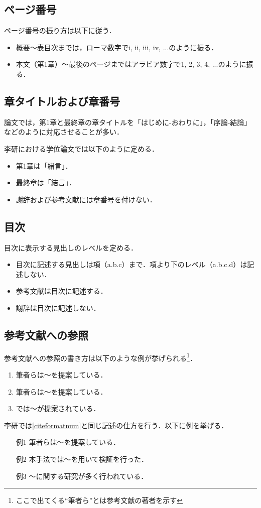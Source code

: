 \documentclass[12pt]{sonota/aislab}
\begin{document}
\subsection{ページ番号}
ページ番号の振り方は以下に従う．
\begin{itemize}
\item 概要～表目次までは，ローマ数字でi, ii, iii, iv, ...のように振る．
\item 本文（第1章）～最後のページまではアラビア数字で1, 2, 3, 4, ...のように振る．
\end{itemize}

\subsection{章タイトルおよび章番号}
論文では，第1章と最終章の章タイトルを「はじめに-おわりに」，「序論-結論」などのように対応させることが多い．

李研における学位論文では以下のように定める．
\begin{itemize}
\item 第1章は「緒言」．
\item 最終章は「結言」．
\item 謝辞および参考文献には章番号を付けない．
\end{itemize}

\subsection{目次}
目次に表示する見出しのレベルを定める．
\begin{itemize}
\item 目次に記述する見出しは項（a.b.c）まで．項より下のレベル（a.b.c.d）は記述しない．
\item 参考文献は目次に記述する．
\item 謝辞は目次に記述しない．
\end{itemize}

\subsection{参考文献への参照}
参考文献への参照の書き方は以下のような例が挙げられる\footnote{ここで出てくる``筆者ら''とは参考文献の著者を示す}．
\begin{enumerate}
\item 筆者ら\cite{test1}は～を提案している．
\item 筆者らは～を提案している\cite{test1}．\label{citeformatnum}
\item \cite{test1}では～が提案されている．
\end{enumerate}
李研では\ref{citeformatnum}と同じ記述の仕方を行う．以下に例を挙げる．
\begin{itemize}
\item[例1] 筆者らは～を提案している\cite{test1}．
\item[例2] 本手法では～を用いて検証を行った\cite{test1, test2}．
\item[例3] ～に関する研究が多く行われている\cite{test1, test2, test3}．
\end{itemize}
\end{document}
